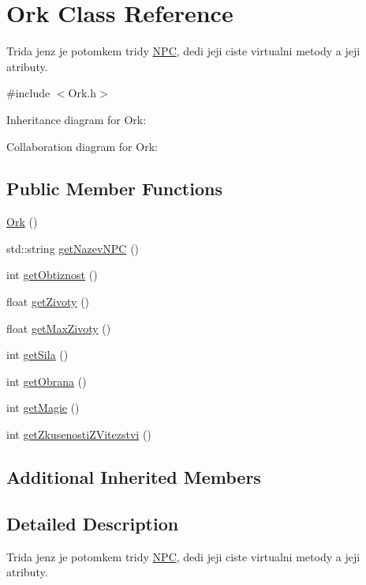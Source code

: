 \hypertarget{class_ork}{\section{Ork Class Reference}
\label{class_ork}
}


Trida jenz je potomkem tridy \hyperlink{class_n_p_c}{N\-P\-C}, dedi jeji ciste virtualni metody a jeji atributy.  




{\ttfamily \#include $<$Ork.\-h$>$}



Inheritance diagram for Ork\-:


Collaboration diagram for Ork\-:
\subsection*{Public Member Functions}
\begin{DoxyCompactItemize}
\item 
\hyperlink{class_ork_a6b5fe351e7ae1b74ea6496620c2fb376}{Ork} ()
\item 
std\-::string \hyperlink{class_ork_a313127e491b2807419c6af93466069c8}{get\-Nazev\-N\-P\-C} ()
\item 
int \hyperlink{class_ork_a4fa8dbfe993bba5b088c58332c23b0e4}{get\-Obtiznost} ()
\item 
float \hyperlink{class_ork_a807ea22358789fb12db54839891b3236}{get\-Zivoty} ()
\item 
float \hyperlink{class_ork_a659119fd3a89a219801f29af1cca71fa}{get\-Max\-Zivoty} ()
\item 
int \hyperlink{class_ork_a34700989b23fa05c2968e1316c626078}{get\-Sila} ()
\item 
int \hyperlink{class_ork_ac4f4c96859423e095532d32ad4e79227}{get\-Obrana} ()
\item 
int \hyperlink{class_ork_a7a2f1e1bfe6d2d4fe9bd59b0ef26eeed}{get\-Magie} ()
\item 
int \hyperlink{class_ork_a036616c8fd6b21e7f16c799e1587757a}{get\-Zkusenosti\-Z\-Vitezstvi} ()
\end{DoxyCompactItemize}
\subsection*{Additional Inherited Members}


\subsection{Detailed Description}
Trida jenz je potomkem tridy \hyperlink{class_n_p_c}{N\-P\-C}, dedi jeji ciste virtualni metody a jeji atributy. 

